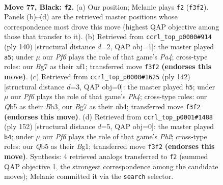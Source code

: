 \documentclass[11pt]{article}
\begin{document}
\clearpage

\begin{figure}[p]\centering
\begin{subfigure}{0.46\textwidth}\centering
\resizebox{\linewidth}{!}{%
\newchessgame
\chessboard[
  setfen={8/2k3b1/8/1q6/7K/5p2/8/8 b - - 1 77},
  showmover=false,
  pgfstyle=straightmove, color=movearrow, markmove={f3-f2}
]}
\caption{}
\end{subfigure}\hfill
\begin{subfigure}{0.46\textwidth}\centering
\resizebox{\linewidth}{!}{%
\newchessgame
\chessboard[
  setfen={7Q/k7/8/6K1/P7/8/8/5n2 w - - 1 71},
  showmover=false,
  pgfstyle=straightmove, color=movearrow, markmove={a4-a5}
]}
\caption{}
\end{subfigure}
\\[4pt]
\begin{subfigure}{0.46\textwidth}\centering
\resizebox{\linewidth}{!}{%
\newchessgame
\chessboard[
  setfen={8/4k1K1/8/8/1n5P/7B/8/8 w - - 1 72},
  showmover=false,
  pgfstyle=straightmove, color=movearrow, markmove={h4-h5}
]}
\caption{}
\end{subfigure}\hfill
\begin{subfigure}{0.46\textwidth}\centering
\resizebox{\linewidth}{!}{%
\newchessgame
\chessboard[
  setfen={8/8/5p2/3k3b/8/8/1P1K4/6B1 w - - 8 77},
  showmover=false,
  pgfstyle=straightmove, color=movearrow, markmove={b2-b4}
]}
\caption{}
\end{subfigure}
\caption{\textbf{Move 77, Black: \texttt{f2}.} (a) Our position; Melanie plays \texttt{f2} (\texttt{f3f2}). Panels (b)--(d) are the retrieved master positions whose correspondence most drove this move (highest QAP objective among those that transfer to it). (b) Retrieved from \texttt{ccrl\_top\_p0000\#914} (ply 140) [structural distance $d$=2, QAP obj=1]: the master played \texttt{a5}; under $\mu$ our \emph{Pf6} plays the role of that game's \emph{Pa4}; cross-type roles: our \emph{B}g7 as their \emph{n}f1; transferred move \texttt{f3f2} \textbf{(endorses this move)}. (c) Retrieved from \texttt{ccrl\_top\_p0000\#1625} (ply 142) [structural distance $d$=3, QAP obj=0]: the master played \texttt{h5}; under $\mu$ our \emph{Pf6} plays the role of that game's \emph{Ph4}; cross-type roles: our \emph{Q}b5 as their \emph{B}h3, our \emph{B}g7 as their \emph{n}b4; transferred move \texttt{f3f2} \textbf{(endorses this move)}. (d) Retrieved from \texttt{ccrl\_top\_p0001\#1488} (ply 152) [structural distance $d$=5, QAP obj=0]: the master played \texttt{b4}; under $\mu$ our \emph{Pf6} plays the role of that game's \emph{Pb2}; cross-type roles: our \emph{Q}b5 as their \emph{B}g1; transferred move \texttt{f3f2} \textbf{(endorses this move)}. Synthesis: 4 retrieved analogs transferred to \texttt{f2} (summed QAP objective 1, the strongest correspondence among the candidate moves); Melanie committed it via the \texttt{search} selector.}
\label{fig:thought-m153}
\end{figure}
\end{document}
